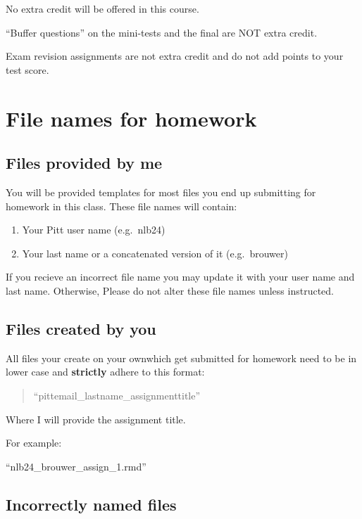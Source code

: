 \documentclass[
]{book}
\providecommand{\tightlist}{%
  \setlength{\itemsep}{0pt}\setlength{\parskip}{0pt}}
\begin{document}
No extra credit will be offered in this course.

``Buffer questions'' on the mini-tests and the final are NOT extra credit.

Exam revision assignments are not extra credit and do not add points to your test score.

\hypertarget{file_names}{%
\chapter{File names for homework}\label{file_names}}

\hypertarget{files-provided-by-me}{%
\section{Files provided by me}\label{files-provided-by-me}}

You will be provided templates for most files you end up submitting for homework in this class. These file names will contain:

\begin{enumerate}
\def\labelenumi{\arabic{enumi}.}
\tightlist
\item
  Your Pitt user name (e.g.~nlb24)
\item
  Your last name or a concatenated version of it (e.g.~brouwer)
\end{enumerate}

If you recieve an incorrect file name you may update it with your user name and last name. Otherwise, Please do not alter these file names unless instructed.

\hypertarget{files-created-by-you}{%
\section{Files created by you}\label{files-created-by-you}}

All files your create on your ownwhich get submitted for homework need to be in lower case and \textbf{strictly} adhere to this format:

\begin{quote}
``pittemail\_lastname\_assignmenttitle''
\end{quote}

Where I will provide the assignment title.

For example:

``nlb24\_brouwer\_assign\_1.rmd''

\hypertarget{incorrectly-named-files}{%
\section{Incorrectly named files}\label{incorrectly-named-files}}
\end{document}
